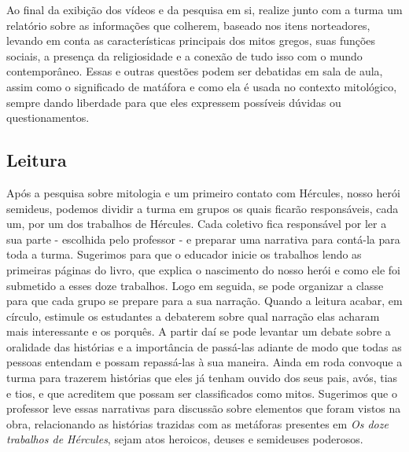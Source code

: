 \documentclass[11pt]{extarticle}
\begin{document}

Ao final da exibição dos vídeos e da pesquisa em si, realize junto com a turma um relatório sobre as informações que colherem, baseado nos itens norteadores, levando em conta as características principais dos mitos gregos, suas funções sociais, a presença da religiosidade e a conexão de tudo isso com o mundo contemporâneo. Essas e outras questões podem ser debatidas em sala de aula, assim como o significado de matáfora e como ela é usada no contexto mitológico, sempre dando liberdade para que eles expressem possíveis dúvidas ou questionamentos.


\subsection{Leitura}


Após a pesquisa sobre mitologia e um primeiro contato com Hércules, nosso herói semideus, podemos dividir a turma em grupos os quais ficarão responsáveis, cada um, por um dos trabalhos de Hércules. Cada coletivo fica responsável por ler a sua parte - escolhida pelo professor - e preparar uma narrativa para contá-la para toda a turma. Sugerimos para que o educador inicie os trabalhos lendo as primeiras páginas do livro, que explica o nascimento do nosso herói e como ele foi submetido a esses doze trabalhos. Logo em seguida, se pode organizar a classe para que cada grupo se prepare para a sua narração. Quando a leitura acabar, em círculo, estimule os estudantes a debaterem sobre qual narração elas acharam mais interessante e os porquês. A partir daí se pode levantar um debate sobre a oralidade das histórias e a importância de passá-las adiante de modo que todas as pessoas entendam e possam repassá-las à sua maneira. Ainda em roda convoque a turma para trazerem histórias que eles já tenham ouvido dos seus pais, avós, tias e tios, e que acreditem que possam ser classificados como mitos. Sugerimos que o professor leve essas narrativas para discussão sobre elementos que foram vistos na obra, relacionando as histórias trazidas com as metáforas presentes em \textit{Os doze trabalhos de Hércules}, sejam atos heroicos, deuses e semideuses poderosos. 
\end{document}
